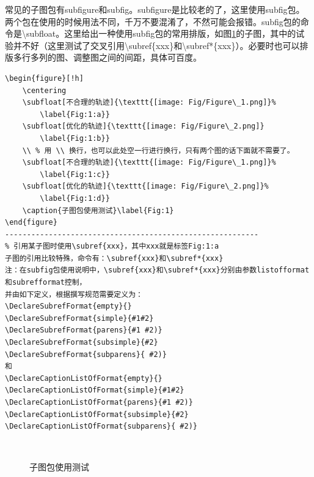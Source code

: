 常见的子图包有subfigure和subfig。subfigure是比较老的了，这里使用subfig包。两个包在使用的时候用法不同，千万不要混淆了，不然可能会报错。subfig包的命令是\textbackslash{}subfloat。这里给出一种使用subfig包的常用排版，如图\ref{Fig:1}的子图，其中的试验并不好（这里测试了交叉引用\textbackslash{}subref\{xxx\}和\textbackslash{}subref*\{xxx\}）。必要时也可以排版多行多列的图、调整图之间的间距，具体可百度。

\begin{lstlisting}
\begin{figure}[!h]
	\centering
	\subfloat[不合理的轨迹]{\texttt{[image: Fig/Figure\_1.png]}%
		\label{Fig:1:a}}
	\subfloat[优化的轨迹]{\texttt{[image: Fig/Figure\_2.png]}
		\label{Fig:1:b}}
	\\ % 用 \\ 换行，也可以此处空一行进行换行，只有两个图的话下面就不需要了。
	\subfloat[不合理的轨迹]{\texttt{[image: Fig/Figure\_1.png]}%
		\label{Fig:1:c}}
	\subfloat[优化的轨迹]{\texttt{[image: Fig/Figure\_2.png]}%
		\label{Fig:1:d}}
	\caption{子图包使用测试}\label{Fig:1}
\end{figure}
----------------------------------------------------------
% 引用某子图时使用\subref{xxx}，其中xxx就是标签Fig:1:a
子图的引用比较特殊，命令有：\subref{xxx}和\subref*{xxx}
注：在subfig包使用说明中，\subref{xxx}和\subref*{xxx}分别由参数listofformat和subrefformat控制，
并由如下定义，根据撰写规范需要定义为：
\DeclareSubrefFormat{empty}{}
\DeclareSubrefFormat{simple}{#1#2}
\DeclareSubrefFormat{parens}{#1 #2)}
\DeclareSubrefFormat{subsimple}{#2}
\DeclareSubrefFormat{subparens}{ #2)}
和
\DeclareCaptionListOfFormat{empty}{}
\DeclareCaptionListOfFormat{simple}{#1#2}
\DeclareCaptionListOfFormat{parens}{#1 #2)}
\DeclareCaptionListOfFormat{subsimple}{#2}
\DeclareCaptionListOfFormat{subparens}{ #2)}
\end{lstlisting}
\begin{figure}[!h]
	\centering
	\\ %
	\caption{子图包使用测试}\label{Fig:1}
\end{figure}



